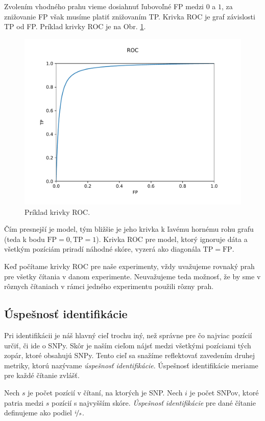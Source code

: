 Zvolením vhodného prahu vieme dosiahnuť ľubovoľné FP medzi $0$ a $1$, za znižovanie FP však musíme
platiť znižovaním TP. Krivka ROC je graf závislosti TP od FP. Príklad krivky ROC je na Obr. \ref{fig:ROC}.

\begin{figure}[t]
\centerline{\includegraphics[width=0.7\linewidth]{images/ROC}}
\caption{Príklad krivky ROC.}
\label{fig:ROC}
\end{figure}

Čím presnejší je model, tým bližšie je jeho krivka k ľavému hornému rohu grafu (teda k bodu $
\mathrm{FP} = 0, \mathrm{TP} = 1$).
Krivka ROC pre model, ktorý ignoruje dáta a všetkým pozíciám priradí náhodné skóre, vyzerá ako diagonála
$\mathrm{TP} = \mathrm{FP}$.

Keď počítame krivky ROC pre naše experimenty, vždy uvažujeme rovnaký prah pre všetky čítania v danom 
experimente. Neuvažujeme teda možnosť, že by sme v rôznych čítaniach v rámci jedného experimentu použili 
rôzny prah.

\subsection{Úspešnosť identifikácie}

Pri identifikácii je náš hlavný cieľ trochu iný, než správne pre čo najviac pozícií určiť, či ide o SNPy. Skôr
je naším cieľom nájsť medzi všetkými pozíciami tých zopár, ktoré obsahujú SNPy. Tento cieľ sa snažíme 
reflektovať zavedením druhej metriky, ktorú nazývame \emph{úspešnosť identifikácie}. Úspešnosť identifikácie
meriame pre každé čítanie zvlášť.

\begin{definicia}
Nech $s$ je počet pozícií v čítaní, na ktorých je SNP. Nech $i$ je počet SNPov, ktoré patria medzi $s$ pozícií
s najvyšším skóre. \emph{Úspešnosť identifikácie} pre dané čítanie definujeme ako podiel $\nicefrac{i}{s}$.
\end{definicia}

